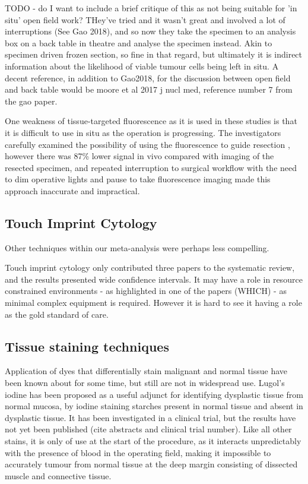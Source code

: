 TODO - do I want to include a brief critique of this as not being suitable for 'in situ' open field work? 
THey've tried and it wasn't great and involved a lot of interruptions (See Gao 2018), and so now they take the specimen to an analysis box on a back table in theatre and analyse the specimen instead. 
Akin to specimen driven frozen section, so fine in that regard, but ultimately it is indirect information about the likelihood of viable tumour cells being left in situ.
A decent reference, in addition to Gao2018, for the discussion between open field and back table would be moore et al 2017 j nucl med, reference number 7 from the gao paper.

One weakness of tissue-targeted fluorescence as it is used in these studies is that it is difficult to use in situ as the operation is progressing. 
The investigators carefully examined the possibility of using the fluorescence to guide resection \cite{mooreCharacterizingUtilityLimitations2017}, however there was 87\% lower signal in vivo compared with imaging of the resected specimen, and repeated interruption to surgical workflow with the need to dim operative lights and pause to take fluorescence imaging made this approach inaccurate and impractical. 

\subsection{Touch Imprint Cytology}

Other techniques within our meta-analysis were perhaps less compelling.

Touch imprint cytology only contributed three papers to the systematic review, and the results presented wide confidence intervals. 
It may have a role in resource constrained environments - as highlighted in one of the papers (WHICH) - as minimal complex equipment is required. 
However it is hard to see it having a role as the gold standard of care.

\subsection{Tissue staining techniques}

Application of dyes that differentially stain malignant and normal tissue have been known about for some time, but still are not in widespread use.
Lugol's iodine has been proposed as a useful adjunct for identifying dysplastic tissue from normal mucosa, by iodine staining starches present in normal tissue and absent in dysplastic tissue.
It has been investigated in a clinical trial, but the results have not yet been published (cite abstracts and clinical trial number).
Like all other stains, it is only of use at the start of the procedure, as it interacts unpredictably with the presence of blood in the operating field, making it impossible to accurately tumour from normal tissue at the deep margin consisting of dissected muscle and connective tissue.

